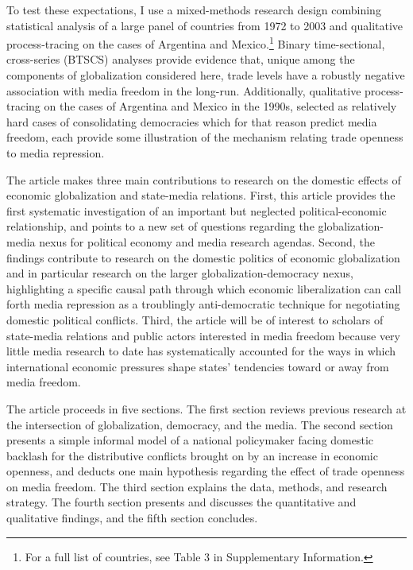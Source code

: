 \documentclass[12pt,a4paper]{article}
\begin{document}
To test these expectations, I use a mixed-methods research design combining statistical analysis of a large panel of countries from 1972 to 2003 and qualitative process-tracing on the cases of Argentina and Mexico.\footnote{For a full list of countries, see Table 3 in Supplementary Information.} Binary time-sectional, cross-series (BTSCS) analyses provide evidence that, unique among the components of globalization considered here, trade levels have a robustly negative association with media freedom in the long-run. Additionally, qualitative process-tracing on the cases of Argentina and Mexico in the 1990s, selected as relatively hard cases of consolidating democracies which for that reason predict media freedom, each provide some illustration of the mechanism relating trade openness to media repression.

The article makes three main contributions to research on the domestic effects of economic globalization and state-media relations. First, this article provides the first systematic investigation of an important but neglected political-economic relationship, and points to a new set of questions regarding the globalization-media nexus for political economy and media research agendas. Second, the findings contribute to research on the domestic politics of economic globalization and in particular research on the larger globalization-democracy nexus, highlighting a specific causal path through which economic liberalization can call forth media repression as a troublingly anti-democratic technique for negotiating domestic political conflicts. Third, the article will be of interest to scholars of state-media relations and public actors interested in media freedom because very little media research to date has systematically accounted for the ways in which international economic pressures shape states' tendencies toward or away from media freedom.

The article proceeds in five sections. The first section reviews previous research at the intersection of globalization, democracy, and the media. The second section presents a simple informal model of a national policymaker facing domestic backlash for the distributive conflicts brought on by an increase in economic openness, and deducts one main hypothesis regarding the effect of trade openness on media freedom. The third section explains the data, methods, and research strategy. The fourth section presents and discusses the quantitative and qualitative findings, and the fifth section concludes.
\end{document}
